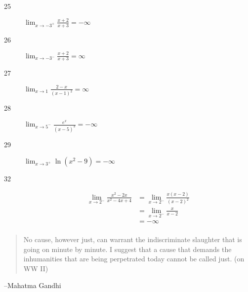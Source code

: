 \documentclass[letterpaper, landscape]{exam}
\begin{document}
\begin{description}



      \item[25] $\lim_{x \to -3^+} \frac{x + 2}{x + 3} = \boxed{ -\infty }$ 

      \item[26] $\lim_{x \to -3^-} \frac{x + 2}{x + 3} = \boxed{ \infty }$ 

      \item[27] $\lim_{x \to 1} \frac{2 - x}{(x - 1)^2} = \boxed{ \infty }$ 

      \item[28] $\lim_{x \to 5^-} \frac{e^x}{(x - 5)^3} = \boxed{ -\infty }$ 

      \item[29] $\lim_{x \to 3^+} \ln \left( x^2 - 9 \right) = \boxed{ -\infty }$ 

      \item[32] 
        \begin{align*}
          \lim_{x \to 2^-} \frac{x^2 - 2x}{x^2 - 4x + 4}   
            & = \lim_{x \to 2^-} \frac{x(x - 2)}{(x - 2)^2} \\
            & = \lim_{x \to 2^-} \frac{x}{x - 2} \\
            & = \boxed{ - \infty } \\
        \end{align*}


    \end{description}

  \else
    \vspace{11 cm}
    \begin{quote}
      \begin{em}
        No cause, however just, can warrant the indiscriminate slaughter that is
        going on minute by minute. I suggest that a cause that demands the
        inhumanities that are being perpetrated today cannot be called just. 
        (on WW II)
      \end{em}
    \end{quote}
    \hspace{1 cm} --Mahatma Gandhi
  \fi
\end{document}
